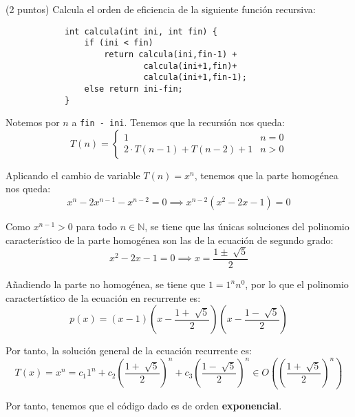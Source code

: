 \documentclass[12pt]{article}
\begin{document}
    \begin{ejercicio}
        (2 puntos) Calcula el orden de eficiencia de la siguiente función recursiva:

        \begin{verbatim}
            int calcula(int ini, int fin) {
                if (ini < fin)
                    return calcula(ini,fin-1) + 
                            calcula(ini+1,fin)+
                            calcula(ini+1,fin-1);
                else return ini-fin;
            }
        \end{verbatim}

        Notemos por $n$ a \verb|fin - ini|. Tenemos que la recursión 
        nos queda:
        \begin{equation*}
            T(n) = \left \{ \begin{array}{lcc} 
                1 & n = 0  \\ 
                2 \cdot T(n-1) + T(n-2) + 1 & n > 0
            \end{array} \right .
        \end{equation*}

        Aplicando el cambio de variable $T(n) = x^{n}$, tenemos 
        que la parte homogénea nos queda:
        \begin{equation*}
            x^{n} - 2x^{n-1} - x^{n-2} = 0 
            \implies x^{n-2}(x^{2} - 2x - 1) = 0
        \end{equation*}

        Como $x^{n-1} > 0$ para todo $n \in \mathbb{N}$, 
        se tiene que las únicas
         soluciones del
        polinomio característico de la parte homogénea son las de la ecuación de 
        segundo grado:
        \begin{equation*}
            x^{2} - 2x - 1 = 0 \implies x = \frac{1 \pm \sqrt[]{5}}{2}
        \end{equation*}
        
        Añadiendo
        la parte no homogénea, se tiene que $1 = 1^{n}n^{0}$, 
        por lo que el polinomio
        caractertístico de la ecuación en recurrente es:
        \begin{equation*}
            p(x) = (x - 1)(x - \frac{1 + \sqrt[]{5}}{2})(x - \frac{1 - \sqrt[]{5}}{2})
        \end{equation*}

        Por tanto, la solución general de la ecuación 
        recurrente es:
        \begin{equation*}
            T(x) = x^{n} = c_{1}1^{n} + 
                            c_{2}(\frac{1 + \sqrt[]{5}}{2})^{n} + 
                            c_{3}(\frac{1 - \sqrt[]{5}}{2})^{n} 
                            \in O((\frac{1 + \sqrt[]{5}}{2})^{n})
        \end{equation*}

        Por tanto, tenemos que el código dado es de orden 
        \textbf{exponencial}.
    \end{ejercicio}
\end{document}
